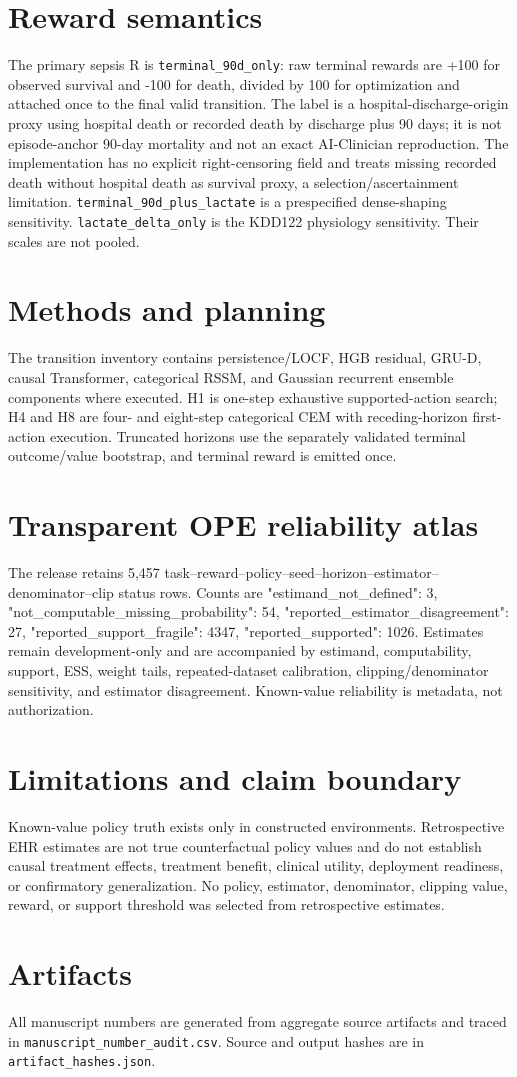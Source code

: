 \documentclass[10pt]{article}
\begin{document}
\section{Reward semantics}
The primary sepsis R is \texttt{terminal\_90d\_only}: raw terminal rewards are +100 for observed survival and -100 for death, divided by 100 for optimization and attached once to the final valid transition. The label is a hospital-discharge-origin proxy using hospital death or recorded death by discharge plus 90 days; it is not episode-anchor 90-day mortality and not an exact AI-Clinician reproduction. The implementation has no explicit right-censoring field and treats missing recorded death without hospital death as survival proxy, a selection/ascertainment limitation. \texttt{terminal\_90d\_plus\_lactate} is a prespecified dense-shaping sensitivity. \texttt{lactate\_delta\_only} is the KDD122 physiology sensitivity. Their scales are not pooled.
\section{Methods and planning}
The transition inventory contains persistence/LOCF, HGB residual, GRU-D, causal Transformer, categorical RSSM, and Gaussian recurrent ensemble components where executed. H1 is one-step exhaustive supported-action search; H4 and H8 are four- and eight-step categorical CEM with receding-horizon first-action execution. Truncated horizons use the separately validated terminal outcome/value bootstrap, and terminal reward is emitted once.
\section{Transparent OPE reliability atlas}
The release retains 5,457 task--reward--policy--seed--horizon--estimator--denominator--clip status rows. Counts are {"estimand\_not\_defined": 3, "not\_computable\_missing\_probability": 54, "reported\_estimator\_disagreement": 27, "reported\_support\_fragile": 4347, "reported\_supported": 1026}. Estimates remain development-only and are accompanied by estimand, computability, support, ESS, weight tails, repeated-dataset calibration, clipping/denominator sensitivity, and estimator disagreement. Known-value reliability is metadata, not authorization.
\section{Limitations and claim boundary}
Known-value policy truth exists only in constructed environments. Retrospective EHR estimates are not true counterfactual policy values and do not establish causal treatment effects, treatment benefit, clinical utility, deployment readiness, or confirmatory generalization. No policy, estimator, denominator, clipping value, reward, or support threshold was selected from retrospective estimates.
\section{Artifacts}
All manuscript numbers are generated from aggregate source artifacts and traced in \texttt{manuscript\_number\_audit.csv}. Source and output hashes are in \texttt{artifact\_hashes.json}.
\end{document}
